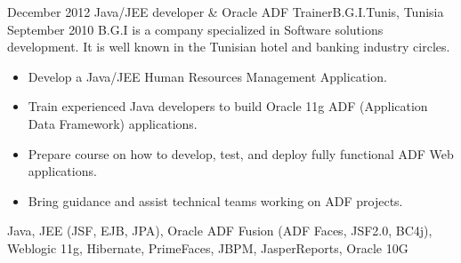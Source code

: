 \begin{experiences}
  \emptySeparator
  \experience
    {December 2012}   {Java/JEE developer \& Oracle ADF Trainer}{B.G.I.}{Tunis, Tunisia}
    {September 2010} {B.G.I is a company specialized in Software solutions development. It is well known in the Tunisian hotel and banking industry circles.}
                    {
                      \begin{itemize}
                        \item Develop a Java/JEE Human Resources Management Application.
                        \item Train experienced Java developers to build Oracle 11g ADF (Application Data Framework) applications.
                        \item Prepare course on how to develop, test, and deploy fully functional ADF Web applications.
                        \item Bring guidance and assist technical teams working on ADF projects.
                      \end{itemize}
                    }
                    {Java, JEE (JSF, EJB, JPA), Oracle ADF Fusion (ADF Faces, JSF2.0, BC4j), Weblogic 11g, Hibernate, PrimeFaces, JBPM, JasperReports, Oracle 10G}
  \emptySeparator
\end{experiences}
